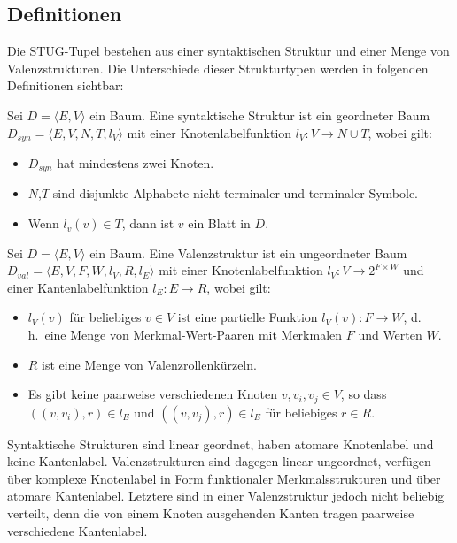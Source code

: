 \subsection{Definitionen}

Die STUG-Tupel bestehen aus einer syntaktischen Struktur und einer Menge von Valenzstrukturen. Die Unterschiede dieser Strukturtypen werden in folgenden Definitionen sichtbar:

\begin{definition} Sei $D = \langle E,V \rangle$ ein Baum. Eine syntaktische Struktur ist ein geordneter Baum $D_{syn} = \langle E,V,N,T,l_V \rangle$ mit einer Knotenlabelfunktion $l_V: V \to N\cup T$, wobei gilt:
\begin{itemize}
  \item $D_{syn}$ hat mindestens zwei Knoten.
  \item $N$,$T$ sind disjunkte Alphabete nicht-terminaler und terminaler Symbole.
  \item Wenn $l_v(v) \in T$, dann ist $v$ ein Blatt in $D$.
\end{itemize} 
\end{definition}

\begin{definition}[Valenzstruktur]
Sei $D = \langle E,V \rangle$ ein Baum. Eine Valenzstruktur ist ein ungeordneter Baum $D_{val} = \langle E,V,F,W,l_V,R,l_E \rangle$ mit einer Knotenlabelfunktion $l_V : V \to 2^{F \times W}$ und einer Kantenlabelfunktion $l_E: E \to R$, wobei gilt:
\begin{itemize} 
  \item $l_V(v)$ für beliebiges $v \in V$ ist eine partielle Funktion $l_V(v): F \to W$, d.\,h.\ eine Menge von Merkmal-Wert-Paaren mit Merkmalen $F$ und Werten $W$.
  \item $R$ ist eine Menge von Valenzrollenkürzeln.
  \item Es gibt keine paarweise verschiedenen Knoten $v,v_i,v_j \in V$, so dass \\ $((v,v_i),r) \in l_E$ und $((v,v_j),r) \in l_E$ für beliebiges $r \in R$.
\end{itemize}  
\end{definition}
Syntaktische Strukturen sind linear geordnet, haben atomare Knotenlabel und keine Kantenlabel. Valenzstrukturen sind dagegen linear ungeordnet, verfügen über komplexe Knotenlabel in Form funktionaler Merkmalsstrukturen und über atomare Kantenlabel. Letztere sind in einer Valenzstruktur jedoch nicht beliebig verteilt, denn die von einem Knoten ausgehenden Kanten tragen paarweise verschiedene Kantenlabel.	


